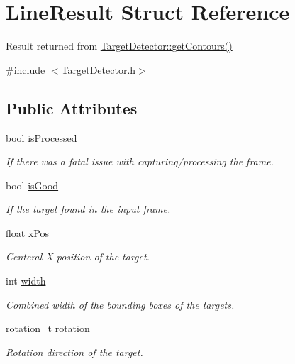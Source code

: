 \hypertarget{structLineResult}{}\section{Line\+Result Struct Reference}
\label{structLineResult}


Result returned from \hyperlink{classTargetDetector_a4e0da3406dc29ce871dbfbb233a5ab5c}{Target\+Detector\+::get\+Contours()}  




{\ttfamily \#include $<$Target\+Detector.\+h$>$}

\subsection*{Public Attributes}
\begin{DoxyCompactItemize}
\item 
bool \hyperlink{structLineResult_a6f6cdb0eaa8db8be8cd08bc3cd3aace0}{is\+Processed}
\begin{DoxyCompactList}\small\item\em If there was a fatal issue with capturing/processing the frame. \end{DoxyCompactList}\item 
bool \hyperlink{structLineResult_ae4c2b3bf916f316b60718ad11731468e}{is\+Good}
\begin{DoxyCompactList}\small\item\em If the target found in the input frame. \end{DoxyCompactList}\item 
float \hyperlink{structLineResult_a1532cc6c0b0f211cba440eb0ed46f0d0}{x\+Pos}
\begin{DoxyCompactList}\small\item\em Centeral X position of the target. \end{DoxyCompactList}\item 
int \hyperlink{structLineResult_afe3f6449af1416355e8209c7fe95359e}{width}
\begin{DoxyCompactList}\small\item\em Combined width of the bounding boxes of the targets. \end{DoxyCompactList}\item 
\hyperlink{TargetDetector_8h_af89160be273160865e8cd55ebc682736}{rotation\+\_\+t} \hyperlink{structLineResult_a840b6b2aab3009238f1520a84093f8b1}{rotation}
\begin{DoxyCompactList}\small\item\em Rotation direction of the target. \end{DoxyCompactList}\end{DoxyCompactItemize}


